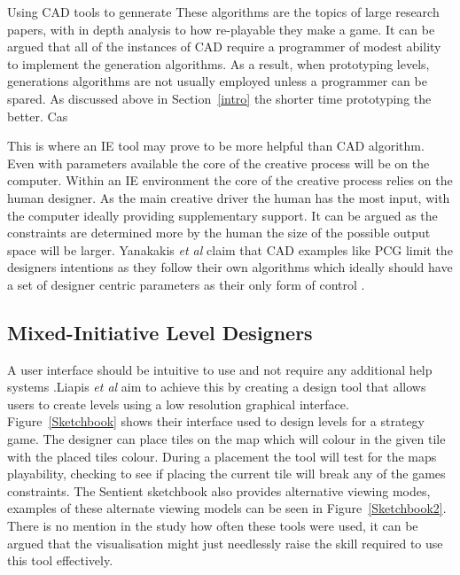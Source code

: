 \documentclass[journal]{IEEEtran}
\begin{document}
 Using CAD tools to gennerate These algorithms are the topics of large research papers, with in depth analysis to how re-playable they make a game. It can be argued that all of the instances of CAD require a programmer of modest ability to implement the generation algorithms. As a result, when prototyping levels, generations algorithms are not usually employed unless a programmer can be spared. As discussed above in Section~\ref{intro} the shorter time prototyping the better. Cas

This is where an IE tool may prove to be more helpful than CAD algorithm. Even with parameters available the core of the creative process will be on the computer. Within an IE environment  the core of the creative process relies on the human designer. As the main creative driver the human has the most input, with the computer ideally providing supplementary support. It can be argued as the constraints are determined more by the human the size of the possible output space will be larger. Yanakakis \textit{et al} \cite{yannakakis2014mixed} claim that CAD examples like PCG limit the designers intentions as they follow their own algorithms which ideally should have a set of designer centric parameters as their only form of control \cite{doran2010controlled}.



\subsection{Mixed-Initiative Level Designers } \label{UI}
A user interface should be intuitive to use and not require any additional help systems \cite{oppermann2002user}.Liapis \textit{et al} \cite{liapis2013sentient} aim to achieve this by  creating a design tool that allows users to create levels using a low resolution graphical interface. Figure~\ref{Sketchbook} shows their interface used to design levels for a strategy game. The designer can place tiles on the map which will colour in the given tile with the placed tiles colour. During a placement the tool will test for the maps playability, checking to see if placing the current tile will break any of the games constraints.  The Sentient sketchbook also provides alternative viewing modes, examples of these alternate viewing models can be seen in Figure~\ref{Sketchbook2}.  There is no mention in the study how often these tools were used, it can be argued that the visualisation might just needlessly raise the skill required to use this tool effectively.
\end{document}
